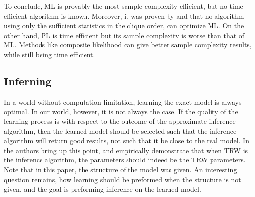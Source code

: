 To conclude, ML is provably the most sample complexity efficient, but no time efficient algorithm is known.
Moreover, it was proven by \cite{bresler2014hardness} and \cite{montanari2015computational} that no algorithm using only the sufficient statistics in the clique order, can optimize ML.
On the other hand, PL is time efficient but its sample complexity is worse than that of ML.
Methods like composite likelihood can give better sample complexity results, while still being time efficient.

\subsection{Inferning}
\label{sec:inferning}
In a world without computation limitation, learning the exact model is always optimal.
In our world, however, it is not always the case.
If the quality of the learning process is with respect to the outcome of the approximate inference algorithm,
then the learned model should be selected such that the inference algorithm will return good results, not such that it be close to the real model.
In \cite{wainwright2006estimating} the authors bring up this point, and empirically demonstrate that when TRW is the inference algorithm, the parameters should indeed be the TRW parameters. 
Note that in this paper, the structure of the model was given.
An interesting question remains, how learning should be preformed when the structure is not given, and the goal is preforming inference on the learned model.

